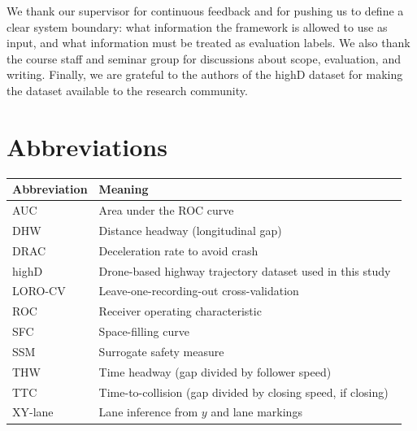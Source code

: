 \documentclass[12pt,a4paper,twoside,openright]{report}
\begin{document}
    We thank our supervisor for continuous feedback and for pushing us to define a clear system boundary: what information the framework is allowed to use as input, and what information must be treated as evaluation labels. We also thank the course staff and seminar group for discussions about scope, evaluation, and writing. Finally, we are grateful to the authors of the highD dataset for making the dataset available to the research community.

    \cleardoublepage
    \tableofcontents

    \cleardoublepage
    \listoffigures

    \cleardoublepage
    \listoftables

    \cleardoublepage
    \chapter*{Abbreviations}

    \begin{tabularx}{\textwidth}{@{}l>{\raggedright\arraybackslash}X@{}}
        \toprule
        Abbreviation & Meaning \\
        \midrule
        AUC & Area under the ROC curve \\
        DHW & Distance headway (longitudinal gap) \\
        DRAC & Deceleration rate to avoid crash \\
        highD & Drone-based highway trajectory dataset used in this study~\cite{highd_2018} \\
        LORO-CV & Leave-one-recording-out cross-validation \\
        ROC & Receiver operating characteristic \\
        SFC & Space-filling curve \\
        SSM & Surrogate safety measure \\
        THW & Time headway (gap divided by follower speed) \\
        TTC & Time-to-collision (gap divided by closing speed, if closing) \\
        XY-lane & Lane inference from $y$ and lane markings \\
        \bottomrule
    \end{tabularx}
\end{document}
